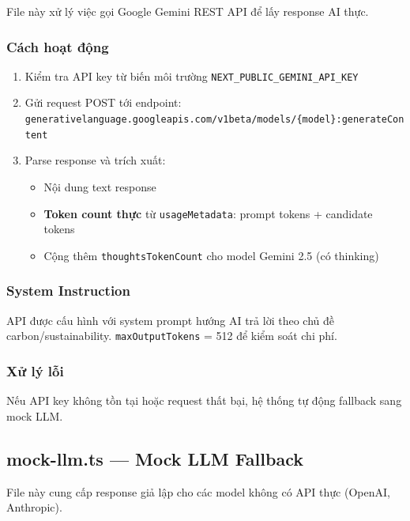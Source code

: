 \documentclass[12pt,a4paper]{article}
\begin{document}
File này xử lý việc gọi Google Gemini REST API để lấy response AI thực.

\subsubsection{Cách hoạt động}

\begin{enumerate}
    \item Kiểm tra API key từ biến môi trường \texttt{NEXT\_PUBLIC\_GEMINI\_API\_KEY}
    \item Gửi request POST tới endpoint: \\
    \texttt{generativelanguage.googleapis.com/v1beta/models/\{model\}:generateContent}
    \item Parse response và trích xuất:
    \begin{itemize}
        \item Nội dung text response
        \item \textbf{Token count thực} từ \texttt{usageMetadata}: prompt tokens + candidate tokens
        \item Cộng thêm \texttt{thoughtsTokenCount} cho model Gemini 2.5 (có thinking)
    \end{itemize}
\end{enumerate}

\subsubsection{System Instruction}

API được cấu hình với system prompt hướng AI trả lời theo chủ đề carbon/sustainability. \texttt{maxOutputTokens} = 512 để kiểm soát chi phí.

\subsubsection{Xử lý lỗi}

Nếu API key không tồn tại hoặc request thất bại, hệ thống tự động fallback sang mock LLM.

\subsection{mock-llm.ts — Mock LLM Fallback}

File này cung cấp response giả lập cho các model không có API thực (OpenAI, Anthropic).
\end{document}
